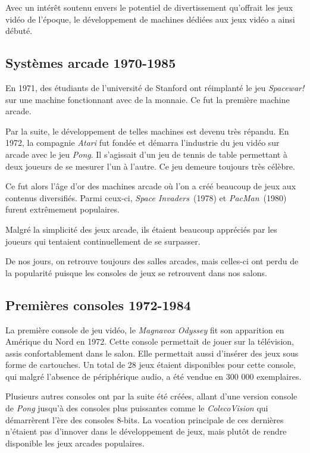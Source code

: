 \documentclass[12pt,twoside,letterpaper,francais]{book}
\begin{document}
Avec un intérêt soutenu envers le potentiel de divertissement
qu'offrait les jeux vidéo de l'époque, le dévelop\-pement de machines
dédiées aux jeux vidéo a ainsi débuté.


\FloatBarrier
\subsection{Systèmes arcade 1970-1985}
En 1971, des étudiants de l'université de Stanford ont réimplanté le
jeu \textit{Spacewar!} sur une machine fonctionnant avec de la
monnaie. Ce fut la première machine arcade.

Par la suite, le dévelop\-pement de telles machines est devenu très
répandu. En 1972, la compagnie \textit{Atari} fut fondée et démarra
l'industrie du jeu vidéo sur arcade avec le jeu \textit{Pong}. Il
s'agissait d'un jeu de tennis de table permettant à deux joueurs de se
mesurer l'un à l'autre. Ce jeu demeure toujours très célèbre.

Ce fut alors l'âge d'or des machines arcade où l'on a créé beaucoup de
jeux aux contenus diversifiés. Parmi ceux-ci, \textit{Space
  Invaders}~(1978) et \textit{PacMan}~(1980) furent extrêmement
populaires.

Malgré la simplicité des jeux arcade, ils étaient beaucoup appréciés
par les joueurs qui tentaient continuellement de se surpasser.

De nos jours, on retrouve toujours des salles arcades, mais celles-ci
ont perdu de la popularité puisque les consoles de jeux se retrouvent
dans nos salons.


\FloatBarrier
\subsection{Premières consoles 1972-1984}
La première console de jeu vidéo, le \textit{Magnavox Odyssey} fit son
apparition en Amérique du Nord en 1972. Cette console permettait de
jouer sur la télévision, assis confortablement dans le salon. Elle
permettait aussi d'insérer des jeux sous forme de cartouches. Un total
de 28 jeux étaient disponibles pour cette console, qui malgré
l'absence de périphérique audio, a été vendue en 300 000 exemplaires.

Plusieurs autres consoles ont par la suite été créées, allant d'une
version console de \textit{Pong} jusqu'à des consoles plus puissantes
comme le \textit{ColecoVision} qui démarrèrent l'ère des consoles
8-bits. La vocation principale de ces dernières n'étaient pas
d'innover dans le dévelop\-pement de jeux, mais plutôt de rendre
disponible les jeux arcades populaires.
\end{document}
